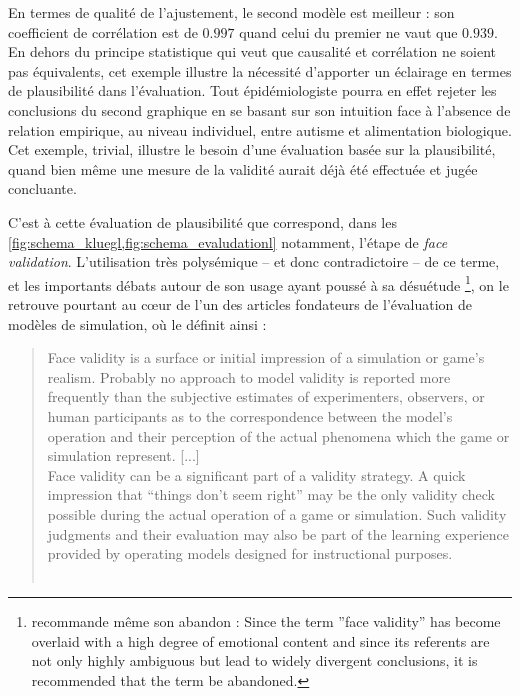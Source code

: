 En termes de qualité de l'ajustement, le second modèle est meilleur : son coefficient de corrélation est de $0.997$ quand celui du premier ne vaut que $0.939$.
En dehors du principe statistique qui veut que causalité et corrélation ne soient pas équivalents, cet exemple illustre la nécessité d'apporter un éclairage en termes de plausibilité dans l'évaluation.
Tout épidémiologiste pourra en effet rejeter les conclusions du second graphique en se basant sur son intuition face à l'absence de relation empirique, au niveau individuel, entre autisme et alimentation biologique.
Cet exemple, trivial, illustre le besoin d'une évaluation basée sur la plausibilité, quand bien même une mesure de la validité aurait déjà été effectuée et jugée concluante.

C'est à cette évaluation de plausibilité que correspond, dans les \cref{fig:schema_kluegl,fig:schema_evaludationl} notamment, l'étape de \og \textit{face validation}\fg{}.
L'utilisation très polysémique -- et donc contradictoire -- de ce terme, et les importants débats autour de son usage ayant poussé à sa désuétude
\footnote{
	\cite[205]{mosier_critical_1947} recommande même son abandon : \og Since the term ''face validity'' has become overlaid with a high degree of emotional content and since its referents are not only highly ambiguous but lead to widely divergent conclusions, it is recommended that the term be abandoned.\fg{}
}, on le retrouve pourtant au cœur de l'un des articles fondateurs de l'évaluation de modèles de simulation, où \citeauthor{hermann_validation_1967} le définit ainsi :

\begin{quotation}
	\noindent \og
	Face validity is a surface or initial impression of a simulation or game's realism.
	Probably no approach to model validity is reported more frequently than the subjective estimates of experimenters, observers, or human participants as to the correspondence between the model's operation and their perception of the actual phenomena which the game or simulation represent.
	[...]\\
	Face validity can be a significant part of a validity strategy.
	A quick impression that ``things don't seem right'' may be the only validity check possible during the actual operation of a game or simulation.
	Such validity judgments and their evaluation may also be part of the learning experience provided by operating models designed for instructional purposes.
	\fg{}\\
	\mbox{}~ \hfill \textcite[221]{hermann_validation_1967}
\end{quotation}

